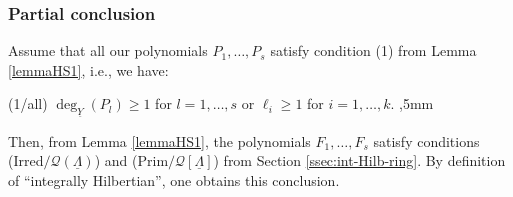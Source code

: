 \documentclass[11pt,a4paper,reqno]{amsart}
\theoremstyle{definition}
\begin{document}
\subsubsection{Partial conclusion}
\label{ssec:general-conclusion} Assume that all our polynomials $P_1,\ldots,P_s$ satisfy condition (1) from Lemma \ref{lemmaHS1}, \hbox{i.e.}, we have:

\vskip 1mm

\noindent
{\rm (1/{\rm all})} $\deg_{\underline Y}(P_l) \geq 1$ for $l=1,\ldots,s$ or $\ell_i \geq 1$ for $i=1,\ldots,k$. 
,5mm

\noindent
Then, from Lemma \ref{lemmaHS1},
the polynomials $F_1,\ldots,F_s$ satisfy conditions (Irred$/{\mathcal Q}(\underline \Lambda)$) and (Prim$/{\mathcal Q}[\underline \Lambda]$) from Section \ref{ssec:int-Hilb-ring}. By definition of ``integrally Hilbertian'', one  
obtains this conclusion. 
\end{document}
